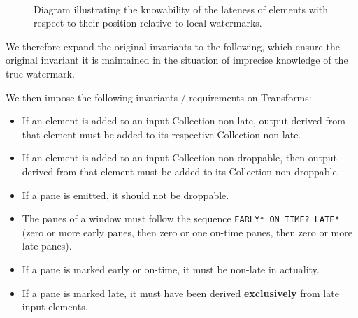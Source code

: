 \begin{figure}[t]
	\\
	\caption{Diagram illustrating the knowability of the lateness of elements with respect to their position relative to local watermarks.}
	\label{fig:impl:lateness-knowability}
\end{figure}


We therefore expand the original invariants to the following, which ensure the original invariant it is maintained in the situation of imprecise knowledge of the true watermark.


We then impose the following invariants / requirements on Transforms:
\begin{itemize}
	\item If an element is added to an input Collection non-late, output derived from that element must be added to its respective Collection non-late.
	\item If an element is added to an input Collection non-droppable, then output derived from that element must be added to its Collection non-droppable.
	\item If a pane is emitted, it should not be droppable.
	\item The panes of a window must follow the sequence \verb|EARLY* ON_TIME? LATE*| (zero or more early panes, then zero or one on-time panes, then zero or more late panes).
	\item If a pane is marked early or on-time, it must be non-late in actuality.
	\item If a pane is marked late, it must have been derived \textbf{exclusively} from late input elements.
\end{itemize}

